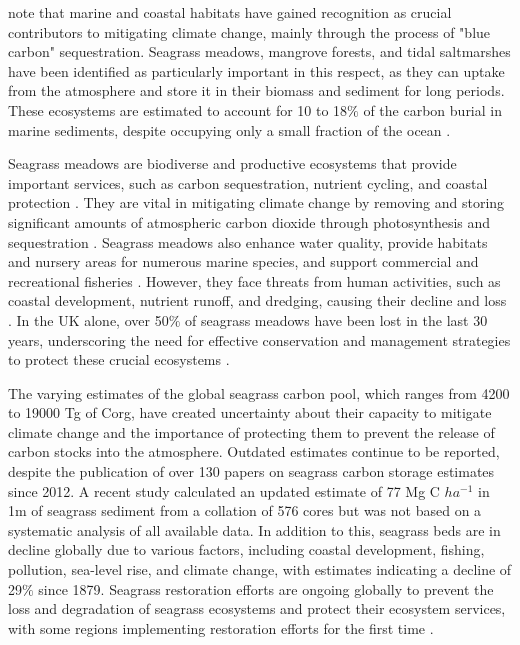 \documentclass[a4paper]{report}
\begin{document}
\citet{luisetti2019quantifying} note that marine and coastal habitats have gained recognition as crucial contributors to mitigating climate change, mainly through the process of "blue carbon" sequestration. Seagrass meadows, mangrove forests, and tidal saltmarshes have been identified as particularly important in this respect, as they can uptake  from the atmosphere and store it in their biomass and sediment for long periods. These ecosystems are estimated to account for 10 to 18$\%$ of the carbon burial in marine sediments, despite occupying only a small fraction of the ocean \citep{bedulli2020contribution}.

Seagrass meadows are biodiverse and productive ecosystems that provide important services, such as carbon sequestration, nutrient cycling, and coastal protection \citep{unsworth2019seagrass, fourqurean2012seagrass}. They are vital in mitigating climate change by removing and storing significant amounts of atmospheric carbon dioxide through photosynthesis and sequestration \citep{fourqurean2012seagrass, duarte2013role}. Seagrass meadows also enhance water quality, provide habitats and nursery areas for numerous marine species, and support commercial and recreational fisheries \citep{unsworth2019seagrass}. However, they face threats from human activities, such as coastal development, nutrient runoff, and dredging, causing their decline and loss \citep{orth2006global}. In the UK alone, over 50$\%$ of seagrass meadows have been lost in the last 30 years, underscoring the need for effective conservation and management strategies to protect these crucial ecosystems \citep{green2021historical}.

The varying estimates of the global seagrass carbon pool, which ranges from 4200 to 19000 Tg of Corg, have created uncertainty about their capacity to mitigate climate change and the importance of protecting them to prevent the release of carbon stocks into the atmosphere. Outdated estimates continue to be reported, despite the publication of over 130 papers on seagrass carbon storage estimates since 2012. A recent study calculated an updated estimate of 77 Mg C $ha^{-1}$ in 1m of seagrass sediment from a collation of 576 cores but was not based on a systematic analysis of all available data. In addition to this, seagrass beds are in decline globally due to various factors, including coastal development, fishing, pollution, sea-level rise, and climate change, with estimates indicating a decline of 29$\%$ since 1879. Seagrass restoration efforts are ongoing globally to prevent the loss and degradation of seagrass ecosystems and protect their ecosystem services, with some regions implementing restoration efforts for the first time \citep{kennedy2022species, evans2018seagrass, waycott2009accelerating, arias2018marine, macreadie2015losses, salinas2020seagrass, luisetti2019quantifying}.
\end{document}
